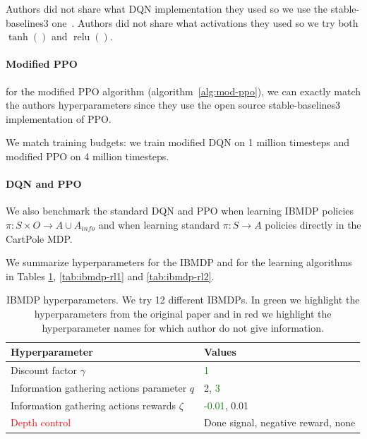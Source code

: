 Authors did not share what DQN implementation they used so we use the stable-baselines3 one~\cite{stable-baselines3}.
Authors did not share what activations they used so we try both $\operatorname{tanh}()$ and $\operatorname{relu}()$. 

\paragraph{Modified PPO} for the modified PPO algorithm (algorithm~\ref{alg:mod-ppo}), we can exactly match the authors hyperparameters since they use the open source stable-baselines3 implementation of PPO.

We match training budgets: we train modified DQN on 1 million timesteps and modified PPO on 4 million timesteps.

\paragraph{DQN and PPO} We also benchmark the standard DQN and PPO when learning IBMDP policies $\pi:S\times O\rightarrow A\cup A_{info}$ and when learning standard $\pi:S\rightarrow A$ policies directly in the CartPole MDP.

We summarize hyperparameters for the IBMDP and for the learning algorithms in Tables \ref{tab:ibmdp-params}, \ref{tab:ibmdp-rl1} and \ref{tab:ibmdp-rl2}.

\begin{table}[h]
    \centering
    \caption{IBMDP hyperparameters. We try 12 different IBMDPs. In green we highlight the hyperparameters from the original paper and in red we highlight the hyperparameter names for which author do not give information.}\label{tab:ibmdp-params}
    \begin{tabular}{ll}
    \toprule
    \textbf{Hyperparameter} & \textbf{Values}\\
    \midrule
    Discount factor $\gamma$ & \textcolor{green}{1} \\
    Information gathering actions parameter $q$ & 2, \textcolor{green}{3} \\
    Information gathering actions rewards $\zeta$ & \textcolor{green}{-0.01}, 0.01 \\
    \textcolor{red}{Depth control} & Done signal, negative reward, none \\ 
    \bottomrule
    \end{tabular}
    \end{table}

